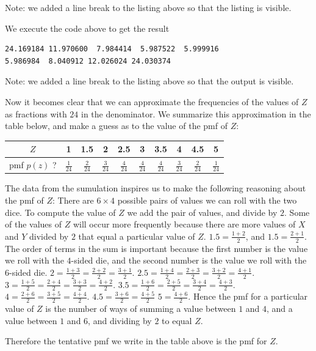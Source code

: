 \documentclass[a4paper,11pt]{article}
\begin{document}
Note: we added a line break to the listing above so that the listing is
visible.

We execute the code above to get the result
\begin{lstlisting}
24.169184 11.970600  7.984414  5.987522  5.999916
5.986984  8.040912 12.026024 24.030374
\end{lstlisting}

Note: we added a line break to the listing above so that the output is visible.

Now it becomes clear that we can approximate the frequencies of the values of
$Z$ as fractions with $24$ in the denominator.  We summarize this approximation
in the table below, and make a guess as to the value of the pmf of $Z$:

\begin{center}
  \begin{tabular}{ | c | c | c | c | c | c | c | c | c | c |}
    \hline
	$Z$ & 1 & 1.5 & 2 & 2.5 & 3 & 3.5 & 4 & 4.5 & 5  \\ \hline
  pmf $p\left( z \right)$ ? & $\frac{1}{24}$ & $\frac{2}{24}$ & $\frac{3}{24}$ &
		$\frac{4}{24}$ & $\frac{4}{24}$ & $\frac{4}{24}$ & $\frac{3}{24}$ & $\frac{2}{24}$ &
		$\frac{1}{24}$ \\ \hline
  \end{tabular}
\end{center}
The data from the sumulation inspires us to make the following reasoning about
the pmf of $Z$:  There are $6 \times 4$ possible pairs of values we can roll
with the two dice.  To compute the value of $Z$ we add the pair of values, and
divide by $2$.  Some of the values of $Z$ will occur more frequently because
there are more values of $X$ and $Y$ divided by $2$ that equal a particular
value of $Z$.  $1.5=\frac{1+2}{2}$, and $1.5=\frac{2+1}{2}$.  The order of
terms in the sum is important because the first number is the value we roll
with the $4$-sided die, and the second number is the value we roll with the
$6$-sided die.  $2=\frac{1+3}{2}=\frac{2+2}{2}=\frac{3+1}{2}$.
$2.5=\frac{1+4}{2}=\frac{2+3}{2}=\frac{3+2}{2}=\frac{4+1}{2}$.
$3=\frac{1+5}{2}=\frac{2+4}{2}=\frac{3+3}{2}=\frac{4+2}{2}$.
$3.5=\frac{1+6}{2}=\frac{2+5}{2}=\frac{3+4}{2}=\frac{4+3}{2}$.
$4=\frac{2+6}{2}=\frac{3+5}{2}=\frac{4+4}{2}$.
$4.5=\frac{3+6}{2}=\frac{4+5}{2}$
$5=\frac{4+6}{2}$.  Hence the pmf for a particular value of $Z$ is the number
of ways of summing a value between $1$ and $4$, and a value between $1$ and
$6$, and dividing by $2$ to equal $Z$.

Therefore the tentative pmf we write in the table above is the pmf for $Z$.
\end{document}
